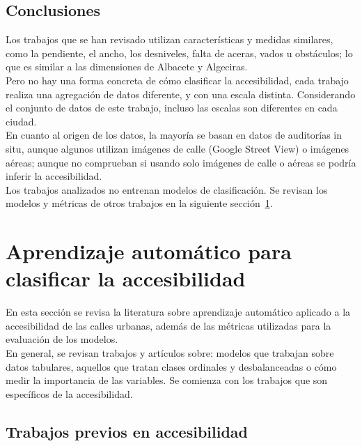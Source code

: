 \subsection{Conclusiones}
\label{subsec:eval-conclusiones}

Los trabajos que se han revisado utilizan características y medidas similares, como la pendiente, el ancho, los desniveles, falta de aceras, vados u obstáculos; lo que es similar a las dimensiones de Albacete y Algeciras.
\\

Pero no hay una forma concreta de cómo clasificar la accesibilidad, cada trabajo realiza una agregación de datos diferente, y con una escala distinta. Considerando el conjunto de datos de este trabajo, incluso las escalas son diferentes en cada ciudad.
\\

En cuanto al origen de los datos, la mayoría se basan en datos de auditorías in situ, aunque algunos utilizan imágenes de calle (Google Street View) o imágenes aéreas; aunque no comprueban si usando solo imágenes de calle o aéreas se podría inferir la accesibilidad.
\\

Los trabajos analizados no entrenan modelos de clasificación. Se revisan los modelos y métricas de otros trabajos en la siguiente sección~\ref{sec:ml}.
\\

\section{Aprendizaje automático para clasificar la accesibilidad}
\label{sec:ml}

En esta sección se revisa la literatura sobre aprendizaje automático aplicado a la accesibilidad de las calles urbanas, además de las métricas utilizadas para la evaluación de los modelos.
\\

En general, se revisan trabajos y artículos sobre: modelos que trabajan sobre datos tabulares, aquellos que tratan clases ordinales y desbalanceadas o cómo medir la importancia de las variables. Se comienza con los trabajos que son específicos de la accesibilidad.
\\

\subsection{Trabajos previos en accesibilidad}
\label{subsec:ml-accesibilidad}

